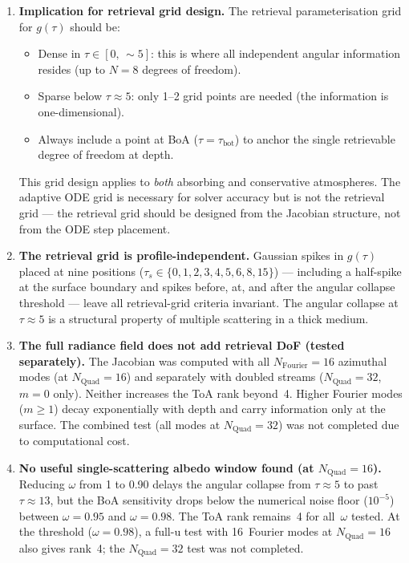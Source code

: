 \documentclass[11pt]{article}
\begin{document}
\begin{enumerate}
\item \textbf{Implication for retrieval grid design.}
  The retrieval parameterisation grid for $g(\tau)$ should be:
  \begin{itemize}
  \item Dense in $\tau \in [0,\,{\sim}5]$: this is where all
    independent angular information resides (up to $N=8$
    degrees of freedom).
  \item Sparse below $\tau\approx 5$: only 1--2 grid points
    are needed (the information is one-dimensional).
  \item Always include a point at BoA ($\tau = \tau_\mathrm{bot}$)
    to anchor the single retrievable degree of freedom
    at depth.
  \end{itemize}
  This grid design applies to \emph{both} absorbing and
  conservative atmospheres.  The adaptive ODE grid is
  necessary for solver accuracy but is not the retrieval grid
  --- the retrieval grid should be designed from the Jacobian
  structure, not from the ODE step placement.

\item \textbf{The retrieval grid is profile-independent.}
  Gaussian spikes in $g(\tau)$ placed at nine positions
  ($\tau_s \in \{0,1,2,3,4,5,6,8,15\}$) --- including a
  half-spike at the surface boundary and spikes before, at,
  and after the angular collapse threshold --- leave all
  retrieval-grid criteria invariant.  The angular collapse at
  $\tau\approx 5$ is a structural property of multiple
  scattering in a thick medium.

\item \textbf{The full radiance field does not add retrieval DoF
  (tested separately).}
  The Jacobian was computed with all $N_\mathrm{Fourier}=16$
  azimuthal modes (at $N_\mathrm{Quad}=16$) and separately
  with doubled streams ($N_\mathrm{Quad}=32$, $m=0$ only).
  Neither increases the ToA rank beyond~4.  Higher Fourier
  modes ($m\geq 1$) decay exponentially with depth and carry
  information only at the surface.  The combined test (all
  modes at $N_\mathrm{Quad}=32$) was not completed due to
  computational cost.

\item \textbf{No useful single-scattering albedo window found
  (at $N_\mathrm{Quad}=16$).}
  Reducing $\omega$ from 1 to 0.90 delays the angular collapse
  from $\tau\approx 5$ to past $\tau\approx 13$, but the BoA
  sensitivity drops below the numerical noise floor ($10^{-5}$)
  between $\omega = 0.95$ and $\omega = 0.98$.  The ToA rank
  remains~4 for all~$\omega$ tested.  At the threshold
  ($\omega = 0.98$), a full-u test with 16~Fourier modes at
  $N_\mathrm{Quad}=16$ also gives rank~4; the $N_\mathrm{Quad}=32$
  test was not completed.
\end{enumerate}
\end{document}

